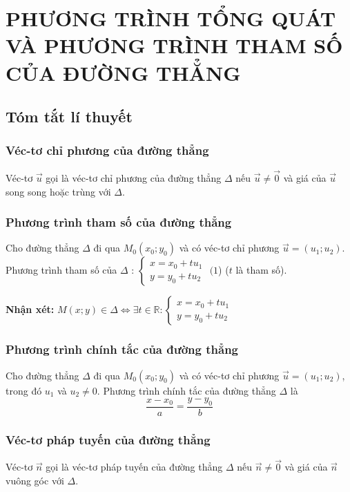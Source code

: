 \section{PHƯƠNG TRÌNH TỔNG QUÁT VÀ PHƯƠNG TRÌNH THAM SỐ CỦA ĐƯỜNG THẲNG}
\subsection{Tóm tắt lí thuyết}
\subsubsection{Véc-tơ chỉ phương của đường thẳng}
\begin{dn}
	Véc-tơ $\vec{u}$ gọi là véc-tơ chỉ phương của đường thẳng $\Delta$ nếu $\vec{u}\ne \vec{0}$ và giá của $\vec{u}$ song song hoặc trùng với $\Delta$.
\end{dn}
\subsubsection{Phương trình tham số của đường thẳng}
\begin{dn}
	Cho đường thẳng $\Delta$  đi qua $M_0(x_0;y_0)$ và có véc-tơ chỉ phương $\vec{u}=(u_1;u_2)$. 
Phương trình tham số của $\Delta$ : $\left\{ \begin{array}{l} x = {x_0} + t{u_1}\\ y = {y_0} + t{u_2}\end{array} \right.$	  $(1$)	($t$ là tham số).
\end{dn}
\begin{note}
	\textbf{Nhận xét:}  $M(x; y) \in \Delta \Leftrightarrow \exists t \in \mathbb{R }: \left\{ \begin{array}{l} x = {x_0} + t{u_1}\\ y = {y_0} + t{u_2}\end{array} \right.$\\
\end{note}
\subsubsection{Phương trình chính tắc của đường thẳng}
\begin{dn}
Cho đường thẳng $\Delta$  đi qua $M_0(x_0;y_0)$ và có véc-tơ chỉ phương $\vec{u}=(u_1;u_2)$, trong đó $u_1$ và $u_2 \ne 0$. Phương trình chính tắc của đường thẳng $\Delta$ là
$$\dfrac{x-x_0}{a}=\dfrac{y-y_0}{b}$$
\end{dn}
\subsubsection{Véc-tơ pháp tuyến của đường thẳng}
\begin{dn}
	Véc-tơ $\vec{n}$ gọi là véc-tơ pháp tuyến của đường thẳng $\Delta$ nếu $\vec{n}\ne \vec{0}$ và giá của $\vec{n}$ vuông góc với $\Delta$.
\end{dn}
